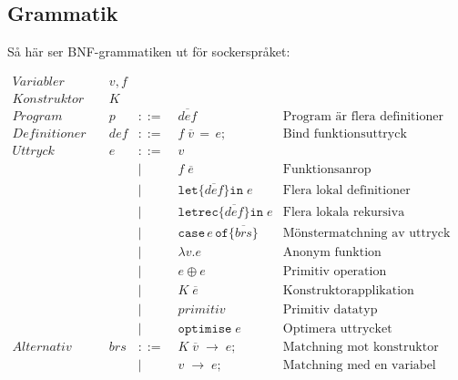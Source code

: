 \documentclass[Rapport]{subfiles}
\begin{document}
\subsection{Grammatik}

Så här ser BNF-grammatiken ut för sockerspråket:


\begin{equation*}
\begin{aligned}
Variabler \quad & v,f \\
Konstruktor \quad & K \\
Program \quad& p &::=&\; \overline{def} 
        & \text{Program är flera definitioner}\\ 
Definitioner  \quad & def & ::=&\; f \; \overline{v} \, \mathtt{=} \, e \mathtt{;} 
        & \text {Bind funktionsuttryck}\\
Uttryck \quad & e &::=&\;  v \\
       &&|&\; f \; \overline{e}  
            & \text{Funktionsanrop} \\ 
       &&|&\; \mathtt{let \{} \overline{def} \mathtt{\} in }\; e 
            & \text{Flera lokal definitioner}\\
       &&|&\; \mathtt{letrec \{} \overline{def} \mathtt{\} in} \; e 
            & \text{Flera lokala rekursiva definitioner} \\
       &&|&\; \mathtt{case} \, e \, \mathtt{of \{} \overline{brs} \mathtt{\}} 
            & \text{Mönstermatchning av uttryck} \\
       &&|&\; \mathtt{\lambda } v \mathtt{.} e
            & \text{Anonym funktion} \\
       &&|&\; e \oplus e 
            & \text{Primitiv operation}\\ 
       &&|&\; K \; \overline{e} 
            & \text{Konstruktorapplikation} \\
       &&|&\; primitiv 
            & \text{Primitiv datatyp} \\
       &&|&\; \mathtt{optimise} \; e 
            & \text{Optimera uttrycket} \\
Alternativ \quad & brs &::=&\; K \; \overline{v} \; \mathtt{\rightarrow} \; e \mathtt{;} 
            & \text{Matchning mot konstruktor} \\
         &&|&\; v \; \mathtt{\rightarrow} \; e \mathtt{;}
            & \text{Matchning med en variabel}
\end{aligned}
\end{equation*}
\end{document}
